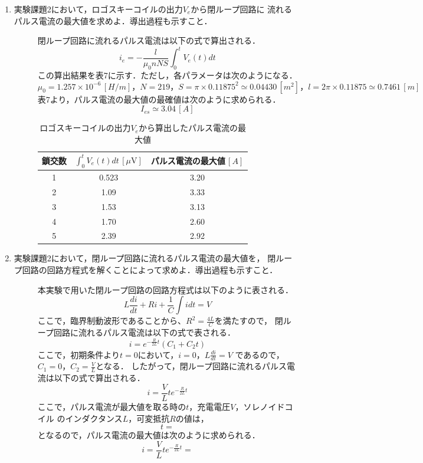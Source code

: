 \begin{enumerate}
    \item 実験課題2において，ロゴスキーコイルの出力$V_e$から閉ループ回路に
    流れるパルス電流の最大値を求めよ．導出過程も示すこと．
    \begin{description}
        \item[] 閉ループ回路に流れるパルス電流は以下の式で算出される．
        $$
        i_e=-\frac{l}{\mu_0 nNS}\int_{0}^{t}V_e(t)dt
        $$
        この算出結果を表7に示す．ただし，各パラメータは次のようになる．
        $$
        \mu_0=1.257\times 10^{-6}\,[\si{H/m}]，N=219，S=\pi\times 0.11875^2\simeq 0.04430\,[\si{m^2}]，l=2\pi\times 0.11875\simeq 0.7461\,[\si{m}]
        $$
        表7より，パルス電流の最大値の最確値は次のように求められる．
        $$
        I_{es}\simeq 3.04\,[\si{A}]
        $$
        \begin{table}[H]
            \centering
            \caption{ロゴスキーコイルの出力$V_e$から算出したパルス電流の最大値}
            \begin{tabular}{c|c|c}
            \hline
                鎖交数 & $\int_{0}^{t}V_e(t)dt\,[\si{\mu \volt}]$ & パルス電流の最大値$\,[\si{A}]$ \\ \hline
                1 & 0.523 & 3.20 \\ 
                2 & 1.09 & 3.33 \\ 
                3 & 1.53 & 3.13 \\ 
                4 & 1.70 & 2.60 \\ 
                5 & 2.39 & 2.92 \\ \hline
            \end{tabular}
        \end{table}
    \end{description}
    
    \newpage

    \item 実験課題2において，閉ループ回路に流れるパルス電流の最大値を，
    閉ループ回路の回路方程式を解くことによって求めよ．導出過程も示すこと．
    \begin{description}
        \item[] 本実験で用いた閉ループ回路の回路方程式は以下のように表される．
        $$
        L\frac{di}{dt}+Ri+\frac{1}{C}\int idt=V
        $$
        ここで，臨界制動波形であることから、$R^2=\frac{4L}{C}$を満たすので，
        閉ループ回路に流れるパルス電流は以下の式で表される．
        $$
        i=e^{-\frac{R}{2L}t}(C_1+C_2t)
        $$
        ここで，初期条件より$t=0$において，$i=0$，$L\frac{di}{dt}=V$
        であるので，$C_1=0$，$C_2=\frac{V}{L}$となる．
        したがって，閉ループ回路に流れるパルス電流は以下の式で算出される．
        $$
        i=\frac{V}{L}te^{-\frac{R}{2L}t}
        $$
        ここで，パルス電流が最大値を取る時の$t$，充電電圧$V$，ソレノイドコイル
        のインダクタンス$L$，可変抵抗$R$の値は，
        $$
        t=
        $$
        となるので，パルス電流の最大値は次のように求められる．
        $$
        i=\frac{V}{L}te^{-\frac{R}{2L}t}=
        $$
    \end{description}
    

\end{enumerate}
